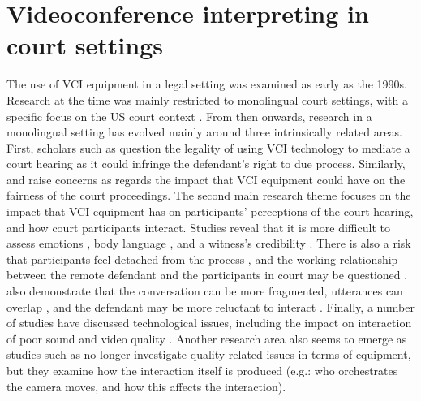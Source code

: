 \documentclass[output=paper]{langsci/langscibook}
\begin{document}
\section{Videoconference interpreting in court settings}
\label{sec:devaux:2}
The use of \textsc{VCI} equipment in a legal setting was examined as early as the 1990s. Research at the time was mainly restricted to monolingual court settings, with a specific focus on the US court context \citep{Radburn-Remfry1994,Thaxton1993}. From then onwards, research in a monolingual setting has evolved mainly around three intrinsically related areas. First, scholars such as \citet{Johnson2006} question the legality of using \textsc{VCI} technology to mediate a court hearing as it could infringe the defendant’s right to due process. Similarly, \citet{Radburn-Remfry1994} and \citet{Thaxton1993} raise concerns as regards the impact that \textsc{VCI} equipment could have on the fairness of the court proceedings. The second main research theme focuses on the impact that \textsc{VCI} equipment has on participants’ perceptions of the court hearing, and how court participants interact. Studies reveal that it is more difficult to assess emotions \citep{Radburn-Remfry1994}, body language \citep{Fullwood2008}, and a witness’s credibility \citep{Roth2000}. There is also a risk that participants feel detached from the process \citep{McKay2016}, and the working relationship between the remote defendant and the participants in court may be questioned \citep{Hodges2008}. \citet{Verdier2011} also demonstrate that the conversation can be more fragmented, utterances can overlap \citep{Licoppe2015}, and the defendant may be more reluctant to interact \citep{Licoppe2014}. Finally, a number of studies have discussed technological issues, including the impact on interaction of poor sound and video quality \citep{Haas2006, Plotnikoff2000}. Another research area also seems to emerge as studies such as \citet{Licoppe2013} no longer investigate quality-related issues in terms of equipment, but they examine how the interaction itself is produced (e.g.: who orchestrates the camera moves, and how this affects the interaction). 
\end{document}
